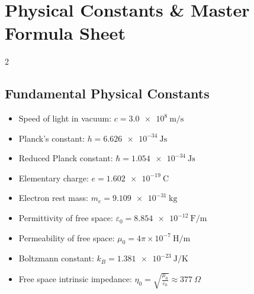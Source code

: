 \chapter*{Physical Constants \& Master Formula Sheet}

\begin{multicols}{2}
{\small
\section*{Fundamental Physical Constants}
\begin{itemize}[leftmargin=*]
    \item Speed of light in vacuum: $c = \SI{3.0e8}{\meter\per\second}$
    \item Planck's constant: $h = \SI{6.626e-34}{\joule\second}$
    \item Reduced Planck constant: $\hbar = \SI{1.054e-34}{\joule\second}$
    \item Elementary charge: $e = \SI{1.602e-19}{\coulomb}$
    \item Electron rest mass: $m_e = \SI{9.109e-31}{\kilo\gram}$
    \item Permittivity of free space: $\varepsilon_0 = \SI{8.854e-12}{\farad\per\meter}$
    \item Permeability of free space: $\mu_0 = 4\pi \times 10^{-7}\ \si{\henry\per\meter}$
    \item Boltzmann constant: $k_B = \SI{1.381e-23}{\joule\per\kelvin}$
    \item Free space intrinsic impedance: $\eta_0 = \sqrt{\frac{\mu_0}{\varepsilon_0}} \approx 377\ \Omega$
\end{itemize}

}
\end{multicols}
